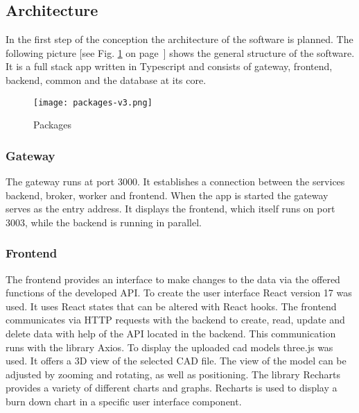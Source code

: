     \subsection*{Architecture}
    In the first step of the conception the architecture of the software is planned. The following picture [see Fig. \ref{fig: packages} on page~\pageref{fig: packages}] shows the general structure of the software. It is a full stack app written in Typescript and consists of gateway, frontend, backend, common and the database at its core. 
    
    \begin{figure}[h]
        \centering
        \texttt{[image: packages-v3.png]}
        \caption{Packages}
        \label{fig: packages}
    \end{figure}

    \subsubsection*{Gateway}
    The gateway runs at port 3000. It establishes a connection between the services backend, broker, worker and frontend. When the app is started the gateway serves as the entry address. It displays the frontend, which itself runs on port 3003, while the backend is running in parallel. 
  
    \subsubsection*{Frontend}
    The frontend provides an interface to make changes to the data via the offered functions of the developed API. To create the user interface React version 17 was used. It uses React states that can be altered with React hooks. The frontend communicates via HTTP requests with the backend to create, read, update and delete data with help of the API located in the backend. This communication runs with the library Axios. To display the uploaded cad models three.js was used. It offers a 3D view of the selected CAD file. The view of the model can be adjusted by zooming and rotating, as well as positioning. The library Recharts provides a variety of different charts and graphs. Recharts is used to display a burn down chart in a specific user interface component.

